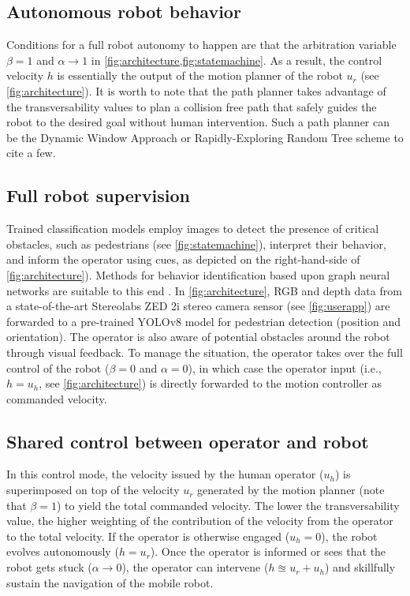 \documentclass[letterpaper, 10 pt, conference]{ieeeconf}  %
\begin{document}
\subsection{Autonomous robot behavior}
Conditions for a full robot autonomy to happen are that the arbitration variable $\beta=1$ and $\alpha\rightarrow 1$ in 	\cref{fig:architecture,fig:statemachine}. As a result, the control velocity $h$ is essentially the output of the motion planner of the  robot $u_r$ (see \cref{fig:architecture}). It is worth to note that the path planner takes advantage of the transversability values to plan a collision free path that safely guides  the robot to the desired goal without human intervention.  Such a path planner can be the Dynamic Window Approach or  Rapidly-Exploring Random Tree scheme  \cite{leung2022hybrid} to cite a few.

\subsection{Full robot supervision}
Trained classification models employ images to detect the presence of critical obstacles, such as pedestrians (see \cref{fig:statemachine}), interpret their behavior, and inform the operator using cues, as depicted on the right-hand-side of \cref{fig:architecture}). Methods for behavior identification based upon graph neural networks are suitable to this end \cite{jang2024multi}. In \cref{fig:architecture}, RGB and depth data from a state-of-the-art Stereolabs ZED 2i stereo camera sensor (see 	\cref{fig:userapp}) are forwarded to a pre-trained YOLOv8 model for pedestrian detection (position and orientation). The operator is also aware of potential obstacles around the robot  through visual feedback. To manage the situation, the operator takes over the full control of the robot ($\beta = 0$ and $\alpha = 0$), in which case the operator input (i.e., $h=u_h$, see \cref{fig:architecture}) is directly forwarded to the motion controller as commanded velocity.

\subsection{Shared control between operator and robot}
In this control mode, the velocity issued by the human operator ($u_h$) is superimposed on top of the velocity $u_r$ generated by the motion planner (note that $\beta = 1$) to yield the  total commanded velocity.  The lower the transversability value, the higher weighting of the contribution  of the velocity from the operator to the total velocity. If the operator is otherwise engaged ($u_h=0$), the robot evolves autonomously ($h=u_r$). Once the operator is informed or sees that the robot gets stuck ($\alpha \rightarrow 0$), the operator can intervene ($h\approxeq u_r + u_h$) and skillfully sustain the navigation of the mobile robot. 
\end{document}
